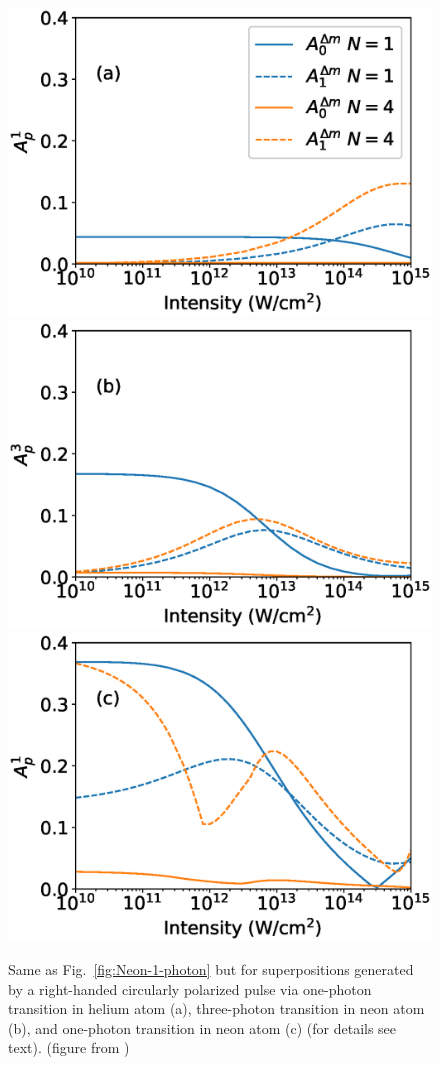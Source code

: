 \begin{figure}[!ht]
\centering
\includegraphics[width=0.32\linewidth]{figs/Photo_ionization/GAP/He_2p1.eps}
\includegraphics[width=0.32\linewidth]{figs/Photo_ionization/GAP/Ne_2p-1_3d2_3p-combined.eps}
\includegraphics[width=0.32\linewidth]{figs/Photo_ionization/GAP/Ne_2p-1_3d0_1p-combined.eps}
\caption{
Same as Fig.~\ref{fig:Neon-1-photon} but for
superpositions generated by a right-handed circularly polarized pulse
via one-photon transition in helium atom (a),  
three-photon transition in neon atom (b), and 
one-photon transition in neon atom (c) (for details see text). (figure from \cite{venzke2020_GAP})
} 
  \label{fig:combined_data}
\end{figure}

